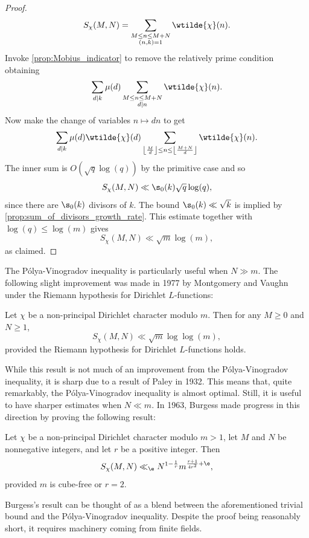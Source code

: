 \documentclass[12pt]{article}
\begin{document}
\begin{proof}
        \[
          S_{\chi}(M,N) = \sum_{\substack{M \le n \le M+N \\ (n,k) = 1}}\wtilde{\chi}(n).
        \]
        Invoke \cref{prop:Mobius_indicator} to remove the relatively prime condition obtaining
        \[
          \sum_{d \mid k}\mu(d)\sum_{\substack{M \le n \le M+N \\ d \mid n}}\wtilde{\chi}(n).
        \]
        Now make the change of variables \(n \mapsto dn\) to get
        \[
          \sum_{d \mid k}\mu(d)\wtilde{\chi}(d)\sum_{\left\lfloor\frac{M}{d}\right\rfloor \le n \le \left\lfloor\frac{M+N}{d}\right\rfloor}\wtilde{\chi}(n).
        \]
        The inner sum is \(O(\sqrt{q}\log(q))\) by the primitive case and so
        \[
          S_{\chi}(M,N) \ll \s_{0}(k)\sqrt{q}\log(q),
        \]
        since there are \(\s_{0}(k)\) divisors of \(k\). The bound \(\s_{0}(k) \ll \sqrt{k}\) is implied by \cref{prop:sum_of_divisors_growth_rate}. This estimate together with \(\log(q) \le \log(m)\) gives
        \[
          S_{\chi}(M,N) \ll \sqrt{m}\log(m),
        \]
        as claimed.
      \end{proof}

      The P\'olya-Vinogradov inequality is particularly useful when \(N \gg m\). The following slight improvement was made in 1977 by Montgomery and Vaughn under the Riemann hypothesis for Dirichlet \(L\)-functions:

      \begin{theorem}
        Let \(\chi\) be a non-principal Dirichlet character modulo \(m\). Then for any \(M \ge 0\) and \(N \ge 1\),
        \[
          S_{\chi}(M,N) \ll \sqrt{m}\log{\log(m)},
        \]
        provided the Riemann hypothesis for Dirichlet \(L\)-functions holds.
      \end{theorem}
      
      While this result is not much of an improvement from the P\'olya-Vinogradov inequality, it is sharp due to a result of Paley in 1932. This means that, quite remarkably, the P\'olya-Vinogradov inequality is almost optimal. Still, it is useful to have sharper estimates when \(N \ll m\). In 1963, Burgess made progress in this direction by proving the following result:

      \begin{theorem}
        Let \(\chi\) be a non-principal Dirichlet character modulo \(m > 1\), let \(M\) and \(N\) be nonnegative integers, and let \(r\) be a positive integer. Then
        \[
          S_{\chi}(M,N) \ll_{\e} N^{1-\frac{1}{r}}m^{\frac{r+1}{4r^{2}}+\e},
        \]
        provided \(m\) is cube-free or \(r = 2\).
      \end{theorem}

      Burgess's result can be thought of as a blend between the aforementioned trivial bound and the P\'olya-Vinogradov inequality. Despite the proof being reasonably short, it requires machinery coming from finite fields.
  
\end{document}
